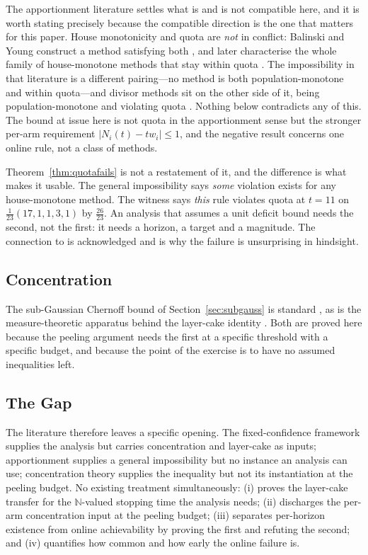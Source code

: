The apportionment literature settles what is and is not compatible here, and it is worth
stating precisely because the compatible direction is the one that matters for this paper.
House monotonicity and quota are \emph{not} in conflict: Balinski and Young construct a
method satisfying both \cite{balinski1975}, and later characterise the whole family of
house-monotone methods that stay within quota \cite{balinski1979}. The impossibility in that
literature is a different pairing---no method is both population-monotone and within
quota---and divisor methods sit on the other side of it, being population-monotone and
violating quota \cite{balinski1982}. Nothing below contradicts any of this. The bound at
issue here is not quota in the apportionment sense but the stronger per-arm requirement
$|N_{i}(t)-t w_{i}|\le 1$, and the negative result concerns one online rule, not a class of
methods.

Theorem~\ref{thm:quotafails} is not a restatement of it, and the difference is what makes it
usable. The general impossibility says \emph{some} violation exists for any house-monotone
method. The witness says \emph{this} rule violates quota at $t=11$ on
$\frac{1}{23}(17,1,1,3,1)$ by $\frac{26}{23}$. An analysis that assumes a unit deficit bound
needs the second, not the first: it needs a horizon, a target and a magnitude. The connection
to \cite{balinski1982} is acknowledged and is why the failure is unsurprising in hindsight.

\subsection{Concentration}

The sub-Gaussian Chernoff bound of Section~\ref{sec:subgauss} is standard
\cite{boucheron2013}, as is the measure-theoretic apparatus behind the layer-cake identity
\cite{durrett2019}. Both are proved here because the peeling argument needs the first at a
specific threshold with a specific budget, and because the point of the exercise is to have no
assumed inequalities left.

\subsection{The Gap}

The literature therefore leaves a specific opening. The fixed-confidence framework supplies
the analysis but carries concentration and layer-cake as inputs; apportionment supplies a
general impossibility but no instance an analysis can use; concentration theory supplies the
inequality but not its instantiation at the peeling budget. No existing treatment
simultaneously: (i) proves the layer-cake transfer for the $\mathbb{N}$-valued stopping time
the analysis needs; (ii) discharges the per-arm concentration input at the peeling budget;
(iii) separates per-horizon existence from online achievability by proving the first and
refuting the second; and (iv) quantifies how common and how early the online failure is.

